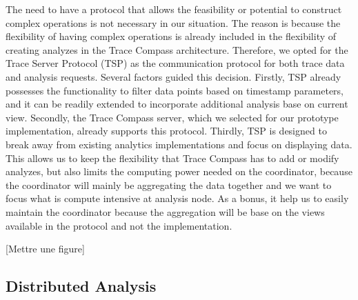 The need to have a protocol that allows the feasibility or potential to construct complex operations is not necessary in our situation. The reason is because the flexibility of having complex operations is already included in the flexibility of creating analyzes in the Trace Compass architecture. Therefore, we opted for the Trace Server Protocol (TSP) as the communication protocol for both trace data and analysis requests. Several factors guided this decision. Firstly, TSP already possesses the functionality to filter data points based on timestamp parameters, and it can be readily extended to incorporate additional analysis base on current view. Secondly, the Trace Compass server, which we selected for our prototype implementation, already supports this protocol. Thirdly, TSP is designed to break away from existing analytics implementations and focus on displaying data. This allows us to keep the flexibility that Trace Compass has to add or modify analyzes, but also limits the computing power needed on the coordinator, because the coordinator will mainly be aggregating the data together and we want to focus what is compute intensive at analysis node. As a bonus, it help us to easily maintain the coordinator because the aggregation will be base on the views available in the protocol and not the implementation.

[Mettre une figure]


\subsection{Distributed Analysis}

